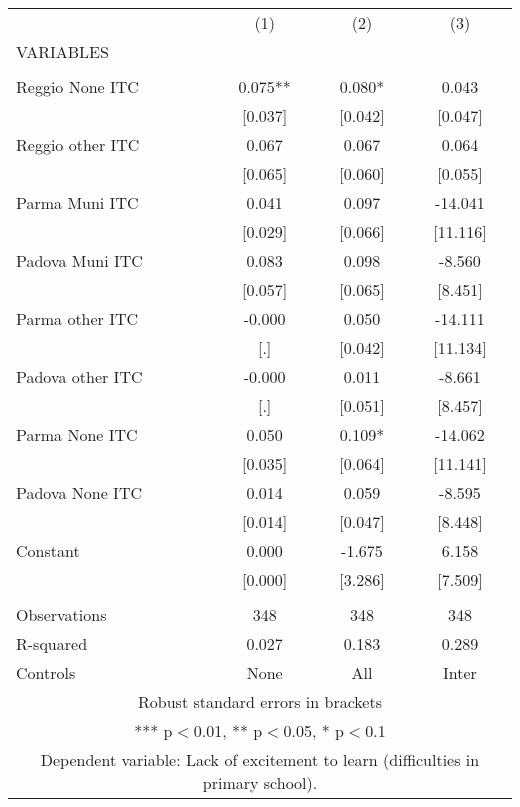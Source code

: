 \begin{tabular}{lccc} \hline
 & (1) & (2) & (3) \\
VARIABLES &  &  &  \\ \hline
 &  &  &  \\
Reggio None ITC & 0.075** & 0.080* & 0.043 \\
 & [0.037] & [0.042] & [0.047] \\
Reggio other ITC & 0.067 & 0.067 & 0.064 \\
 & [0.065] & [0.060] & [0.055] \\
Parma Muni ITC & 0.041 & 0.097 & -14.041 \\
 & [0.029] & [0.066] & [11.116] \\
Padova Muni ITC & 0.083 & 0.098 & -8.560 \\
 & [0.057] & [0.065] & [8.451] \\
Parma other ITC & -0.000 & 0.050 & -14.111 \\
 & [.] & [0.042] & [11.134] \\
Padova other ITC & -0.000 & 0.011 & -8.661 \\
 & [.] & [0.051] & [8.457] \\
Parma None ITC & 0.050 & 0.109* & -14.062 \\
 & [0.035] & [0.064] & [11.141] \\
Padova None ITC & 0.014 & 0.059 & -8.595 \\
 & [0.014] & [0.047] & [8.448] \\
Constant & 0.000 & -1.675 & 6.158 \\
 & [0.000] & [3.286] & [7.509] \\
 &  &  &  \\
Observations & 348 & 348 & 348 \\
R-squared & 0.027 & 0.183 & 0.289 \\
 Controls & None & All & Inter \\ \hline
\multicolumn{4}{c}{ Robust standard errors in brackets} \\
\multicolumn{4}{c}{ *** p$<$0.01, ** p$<$0.05, * p$<$0.1} \\
\multicolumn{4}{c}{ Dependent variable: Lack of excitement to learn (difficulties in primary school).} \\
\end{tabular}
